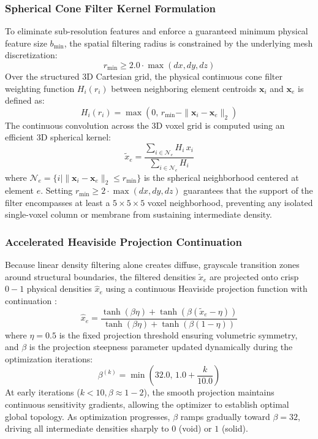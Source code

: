 \documentclass[11pt, a4paper]{article}
\begin{document}
\subsubsection{Spherical Cone Filter Kernel Formulation}
To eliminate sub-resolution features and enforce a guaranteed minimum physical feature size $b_{\min}$, the spatial filtering radius is constrained by the underlying mesh discretization:
\begin{equation}
r_{\min} \ge 2.0 \cdot \max(dx, dy, dz)
\end{equation}
Over the structured 3D Cartesian grid, the physical continuous cone filter weighting function $H_i(r_i)$ between neighboring element centroids $\mathbf{x}_i$ and $\mathbf{x}_e$ is defined as:
\begin{equation}
H_i(r_i) = \max\left(0, \, r_{\min} - \|\mathbf{x}_i - \mathbf{x}_e\|_2\right)
\end{equation}
The continuous convolution across the 3D voxel grid is computed using an efficient 3D spherical kernel:
\begin{equation}
\tilde{x}_e = \frac{\sum_{i \in \mathcal{N}_e} H_i \, x_i}{\sum_{i \in \mathcal{N}_e} H_i}
\end{equation}
where $\mathcal{N}_e = \{i \mid \|\mathbf{x}_i - \mathbf{x}_e\|_2 \le r_{\min}\}$ is the spherical neighborhood centered at element $e$. Setting $r_{\min} \ge 2 \cdot \max(dx, dy, dz)$ guarantees that the support of the filter encompasses at least a $5 \times 5 \times 5$ voxel neighborhood, preventing any isolated single-voxel column or membrane from sustaining intermediate density.

\subsubsection{Accelerated Heaviside Projection Continuation}
Because linear density filtering alone creates diffuse, grayscale transition zones around structural boundaries, the filtered densities $\tilde{x}_e$ are projected onto crisp $0-1$ physical densities $\hat{x}_e$ using a continuous Heaviside projection function with continuation \cite{wang2011, guest2004}:
\begin{equation}
\hat{x}_e = \frac{\tanh(\beta \eta) + \tanh(\beta (\tilde{x}_e - \eta))}{\tanh(\beta \eta) + \tanh(\beta (1 - \eta))}
\end{equation}
where $\eta = 0.5$ is the fixed projection threshold ensuring volumetric symmetry, and $\beta$ is the projection steepness parameter updated dynamically during the optimization iterations:
\begin{equation}
\beta^{(k)} = \min\left(32.0, \, 1.0 + \frac{k}{10.0}\right)
\end{equation}
At early iterations ($k < 10, \beta \approx 1-2$), the smooth projection maintains continuous sensitivity gradients, allowing the optimizer to establish optimal global topology. As optimization progresses, $\beta$ ramps gradually toward $\beta = 32$, driving all intermediate densities sharply to $0$ (void) or $1$ (solid).
\end{document}
